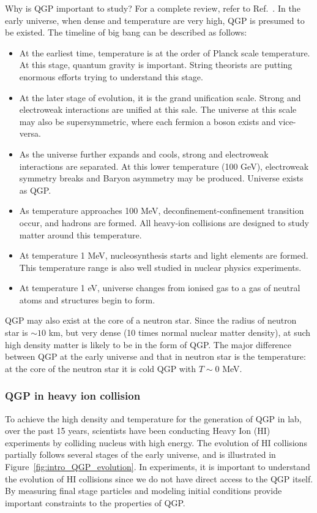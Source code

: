 Why is QGP important to study? For a complete review, refer to Ref.~\cite{Busza:2018rrf}. In the early universe, when dense and temperature are very high, QGP is presumed to be existed. The timeline of big bang can be described as follows:
\begin{itemize}
\item At the earliest time, temperature is at the order of Planck scale temperature. At this stage, quantum gravity is important. String theorists are putting enormous efforts trying to understand this stage.
\item At the later stage of evolution, it is the grand unification scale. Strong and electroweak interactions are unified at this sale. The universe at this scale may also be supersymmetric, where each fermion a boson exists and vice-versa.
\item As the universe further expands and cools, strong and electroweak interactions are separated. At this lower temperature (100 GeV), electroweak symmetry breaks and Baryon asymmetry may be produced. Universe exists as QGP.
\item As temperature approaches 100 MeV, deconfinement-confinement transition occur, and hadrons are formed. All heavy-ion collisions are designed to study matter around this temperature.
\item At temperature 1 MeV, nucleosynthesis starts and light elements are formed. This temperature range is also well studied in nuclear physics experiments.
\item At temperature 1 eV, universe changes from ionised gas to a gas of neutral atoms and structures begin to form.
\end{itemize}

QGP may also exist at the core of a neutron star. Since the radius of neutron star is $\sim 10$ km, but very dense (10 times normal nuclear matter density), at such high density matter is likely to be in the form of QGP. The major difference between QGP at the early universe and that in neutron star is the temperature: at the core of the neutron star it is cold QGP with $T\sim 0$ MeV.



\subsubsection{QGP in heavy ion collision}
\label{sec:qgp_in_lab}

To achieve the high density and temperature for the generation of QGP in lab, over the past 15 years, scientists have been conducting Heavy Ion (HI) experiments by colliding nucleus with high energy. The evolution of HI collisions partially follows several stages of the early universe, and is illustrated in Figure~\ref{fig:intro_QGP_evolution}. In experiments, it is important to understand the evolution of HI collisions since we do not have direct access to the QGP itself. By measuring final stage particles and modeling initial conditions provide important constraints to the properties of QGP.

